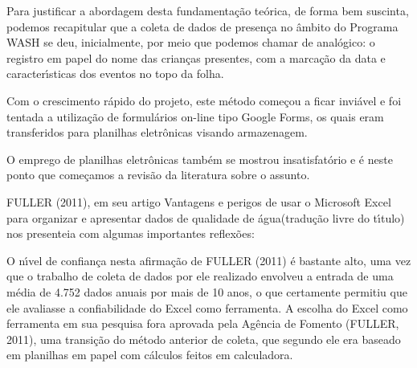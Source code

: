 \documentclass[
12pt,		%
openright,	%
twoside,  %
a4paper,			%
chapter=TITLE,		%
english,			%
french,				%
spanish,			%
brazil				%
]{USPSC-classe/USPSC}
\begin{document}
Para justificar a abordagem desta fundamenta\c{c}\~ao te\'orica, de forma bem suscinta, podemos recapitular que a coleta de dados de presen\c{c}a no \^ambito do Programa WASH se deu, inicialmente, por meio que podemos chamar de anal\'ogico: o registro em papel do nome das crian\c{c}as presentes, com a marca\c{c}\~ao da data e caracter\'{\i}sticas dos eventos no topo da folha.










Com o crescimento r\'apido do projeto, este m\'etodo come\c{c}ou a ficar invi\'avel e foi tentada a utiliza\c{c}\~ao de formul\'arios on-line tipo \textquotedbl Google Forms\textquotedbl , os quais eram transferidos para planilhas eletr\^onicas visando armazenagem.










O emprego de planilhas eletr\^onicas tamb\'em se mostrou insatisfat\'orio e \'e neste ponto que come\c{c}amos a revis\~ao da literatura sobre o assunto.










FULLER (2011), em seu artigo \textquotedbl Vantagens e perigos de usar o Microsoft Excel para organizar e apresentar dados de qualidade de \'agua\textquotedbl  (tradu\c{c}\~ao livre do t\'{\i}tulo) nos presenteia com algumas importantes reflex\~oes:











\noindent\begin{center}\mbox{\centering{}}\end{center}


O n\'{\i}vel de confian\c{c}a nesta afirma\c{c}\~ao de  FULLER (2011) \'e bastante alto, uma vez que o trabalho de coleta de dados por ele realizado envolveu a entrada de uma m\'edia de 4.752 dados anuais por mais de 10 anos, o que certamente permitiu que ele avaliasse a confiabilidade do Excel como ferramenta. A escolha do Excel como ferramenta em sua pesquisa fora aprovada pela Ag\^encia de Fomento  (FULLER, 2011), uma transi\c{c}\~ao do m\'etodo anterior de coleta, que segundo ele era baseado em planilhas em papel com c\'alculos feitos em calculadora.
\end{document}

